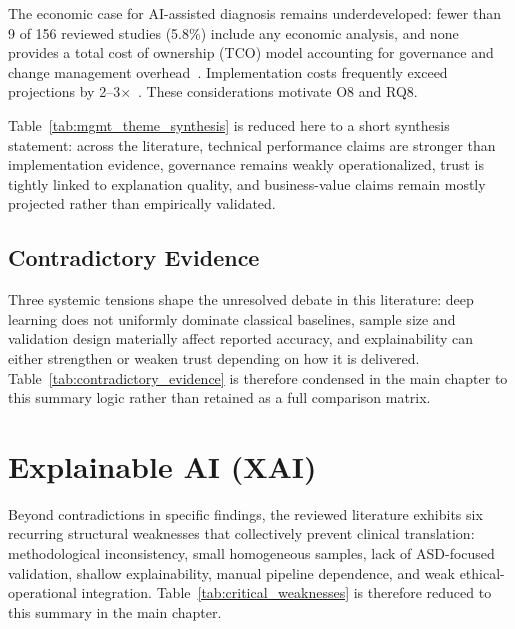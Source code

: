 The economic case for AI-assisted diagnosis remains underdeveloped: fewer than 9 of 156 reviewed studies (5.8\%) include any economic analysis, and none provides a total cost of ownership (TCO) model accounting for governance and change management overhead~\cite{topol2019deep, sendak2020healthcare}. Implementation costs frequently exceed projections by 2--3$\times$~\cite{sendak2020healthcare}. These considerations motivate O8 and RQ8.

Table~\ref{tab:mgmt_theme_synthesis} is reduced here to a short synthesis statement: across the literature, technical performance claims are stronger than implementation evidence, governance remains weakly operationalized, trust is tightly linked to explanation quality, and business-value claims remain mostly projected rather than empirically validated.

\subsection{Contradictory Evidence}

Three systemic tensions shape the unresolved debate in this literature: deep learning does not uniformly dominate classical baselines, sample size and validation design materially affect reported accuracy, and explainability can either strengthen or weaken trust depending on how it is delivered. Table~\ref{tab:contradictory_evidence} is therefore condensed in the main chapter to this summary logic rather than retained as a full comparison matrix.

\section{Explainable AI (XAI)}

Beyond contradictions in specific findings, the reviewed literature exhibits six recurring structural weaknesses that collectively prevent clinical translation: methodological inconsistency, small homogeneous samples, lack of ASD-focused validation, shallow explainability, manual pipeline dependence, and weak ethical-operational integration. Table~\ref{tab:critical_weaknesses} is therefore reduced to this summary in the main chapter.

